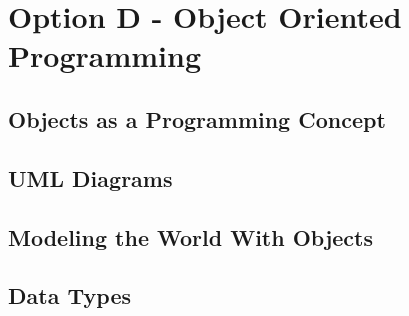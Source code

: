 \chapter{Option D - Object Oriented Programming}

\section{Objects as a Programming Concept}



\section{UML Diagrams}


\section{Modeling the World With Objects}

\section{Data Types}

